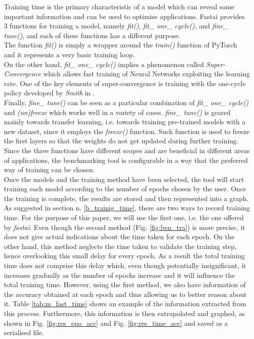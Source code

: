 Training time is the primary characteristic of a model which can reveal some important information and can be used to optimise applications. 
Fastai provides 3 functions for training a model, namely \textit{fit()}, \textit{fit\_ one\_ cycle()}, and \textit{fine\_ tune()}, and each of these functions has a different purpose.\\
The function \textit{fit()} is simply a wrapper around the \textit{train()} function of PyTorch and it represents a very basic training loop.\cite{fastaidocs} \\
On the other hand, \textit{fit\_ one\_ cycle()} implies a phenomenon called \textit{Super-Convergence} which allows fast training of Neural Networks exploiting the learning rate. \cite{DBLP:journals/corr/abs-1708-07120}
One of the key elements of super-convergence is training with the one-cycle policy developed by \textit{Smith} in \cite{DBLP:journals/corr/abs-1803-09820}. \cite{DBLP:journals/corr/abs-1708-07120}\\
Finally, \textit{fine\_ tune()} can be seen as a particular combination of \textit{fit\_ one\_ cycle()} and \textit{(un)freeze} which works well in a variety of cases. \textit{fine\_ tune()} is geared mainly towards transfer learning, i.e. towards training pre-trained models with a new dataset, since it employs the \textit{freeze()} function. Such function is used to freeze the first layers so that the weights do not get updated during further training.\cite{fastaidocs}\\
Since the three functions have different scopes and are beneficial in different areas of applications, the benchmarking tool is configurable in a way that the preferred way of training can be chosen. \\
Once the models and the training method have been selected, the tool will start training each model according to the number of epochs chosen by the user. Once the training is complete, the results are stored and then represented into a graph. \\
As suggested in section n. \ref{b_trainig_time}, there are two ways to record training time. For the purpose of this paper, we will use the first one, i.e. the one offered by \textit{fastai}. Even though the second method (Fig. \ref{fig:ben_tra}) is more precise, it does not give actual indications about the time taken for each epoch. On the other hand, this method neglects the time taken to validate the training step, hence overlooking this small delay for every epoch. As a result the total training time does not comprise this delay which, even though potentially insignificant, it increases gradually as the number of epochs increase and it will influence the total training time. However, using the first method, we also have information of the accuracy obtained at each epoch
and thus allowing us to better reason about it. Table \ref{tab:m_fast_time} shows an example of the information extracted from this process. Furthermore, this information is then extrapolated and graphed, as shown in Fig. \ref{fig:res_epo_acc} and Fig. \ref{fig:res_time_acc} and saved as a serialised file. 




